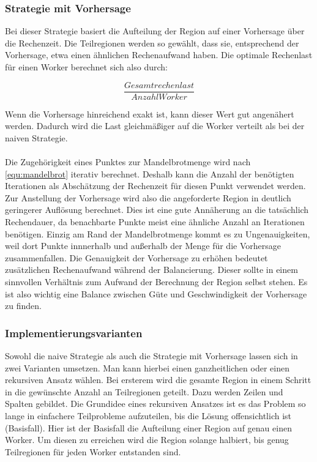 \subsubsection{Strategie mit Vorhersage}

Bei dieser Strategie basiert die Aufteilung der Region auf einer Vorhersage über die Rechenzeit.
Die Teilregionen werden so gewählt, dass sie, entsprechend der Vorhersage, etwa einen ähnlichen Rechenaufwand haben.
Die optimale Rechenlast für einen Worker berechnet sich also durch:

\begin{equation}\label{equ:desiredN}
	\frac{Gesamtrechenlast}{AnzahlWorker}
\end{equation}

Wenn die Vorhersage hinreichend exakt ist, kann dieser Wert gut angenähert werden.
Dadurch wird die Last gleichmäßiger auf die Worker verteilt als bei der naiven Strategie.

\paragraph*{}\label{par:load_balancing_prediction}
Die Zugehörigkeit eines Punktes zur Mandelbrotmenge wird nach \autoref{equ:mandelbrot} iterativ berechnet.
Deshalb kann die Anzahl der benötigten Iterationen als Abschätzung der Rechenzeit für diesen Punkt verwendet werden.
Zur Anstellung der Vorhersage wird also die angeforderte Region in deutlich geringerer Auflösung berechnet.
Dies ist eine gute Annäherung an die tatsächlich Rechendauer, da benachbarte Punkte meist eine ähnliche Anzahl an Iterationen benötigen.
Einzig am Rand der Mandelbrotmenge kommt es zu Ungenauigkeiten, weil dort Punkte innnerhalb und außerhalb der Menge für die Vorhersage zusammenfallen.
Die Genauigkeit der Vorhersage zu erhöhen bedeutet zusätzlichen Rechenaufwand während der Balancierung.
Dieser sollte in einem sinnvollen Verhältnis zum Aufwand der Berechnung der Region selbst stehen.
Es ist also wichtig eine Balance zwischen Güte und Geschwindigkeit der Vorhersage zu finden.

\subsubsection{Implementierungsvarianten}

Sowohl die naive Strategie als auch die Strategie mit Vorhersage lassen sich in zwei Varianten umsetzen.
Man kann hierbei einen ganzheitlichen oder einen rekursiven Ansatz wählen.
Bei ersterem wird die gesamte Region in einem Schritt in die gewünschte Anzahl an Teilregionen geteilt.
Dazu werden Zeilen und Spalten gebildet.
Die Grundidee eines rekursiven Ansatzes ist es das Problem so lange in einfachere Teilprobleme aufzuteilen, bis die Lösung offensichtlich ist (Basisfall).
Hier ist der Basisfall die Aufteilung einer Region auf genau einen Worker.
Um diesen zu erreichen wird die Region solange halbiert, bis genug Teilregionen für jeden Worker entstanden sind.

